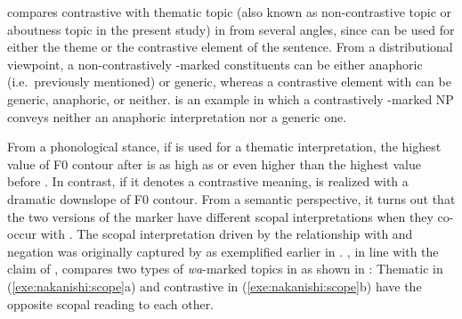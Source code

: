 \citet{nakanishi:07} compares contrastive  with thematic topic
(also known as non-contrastive topic or aboutness topic in the present
study) in  from several angles, since \wa can be used
for either the theme or the contrastive element of the sentence. From
a distributional viewpoint, a non-contrastively \wa-marked
constituents can be either anaphoric (i.e.\ previously mentioned) or
generic, whereas a contrastive element with \wa can be generic,
anaphoric, or neither.  is an example in
which a contrastively \wa-marked NP conveys neither an anaphoric
interpretation nor a generic one.




\noindent From a phonological stance, if \wa is used for a thematic
interpretation, the highest value of F0 contour after \wa is as high
as or even higher than the highest value before \wa.
In contrast, if it denotes a contrastive meaning,
\wa is realized with a dramatic
downslope of F0 contour.  From a semantic perspective, it turns out
that the two versions of the marker have different scopal
interpretations when they co-occur with . The scopal
interpretation driven by the relationship with  and negation was
originally captured by \citet{buring:97} as exemplified earlier in
. \citeauthor{nakanishi:07}, in line with the
claim of \citeauthor{buring:97}, compares two types of
\textit{wa}-marked topics in  as shown in
: Thematic \wa in
(\ref{exe:nakanishi:scope}a) and contrastive \wa in
(\ref{exe:nakanishi:scope}b) have the opposite scopal reading to each
other.





